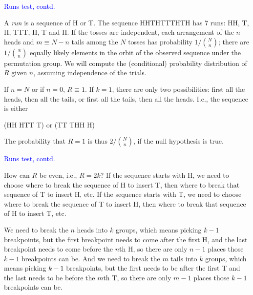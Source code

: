 \documentclass[landscape]{slides}
\begin{document}
\begin{slide}
{\textcolor{blue}{Runs test, contd.}}

A {\em run\/} is a sequence of H or T.  
The sequence HHTHTTTHTH has 7 runs: HH, T, H, TTT, H, T and H.
If the tosses are independent, each arrangement of the $n$ heads 
and $m \equiv N-n$ tails among
    the $N$ tosses has probability $1/{{N}\choose{n}}$;
    there are $1/{{N}\choose{n}}$ equally likely elements in the orbit of
    the observed sequence under the permutation group.
    We will compute the (conditional) probability distribution of $R$ given
    $n$, assuming independence of the trials.

    If $n=N$ or if $n = 0$, $R \equiv 1$.
    If $k= 1$, there are only two possibilities: first all the heads,
    then all the tails, or first all the tails, then all the heads.
    I.e., the sequence is either

\begin{center}
   (HH \textellipsis HTT \textellipsis T) or (TT \textellipsis THH \textellipsis H)
\end{center}

    The probability that $R=1$ is thus $2/{{N}\choose{n}}$,
    if the null hypothesis is true.

\end{slide}

\begin{slide}
{\textcolor{blue}{Runs test, contd.}}

    How can $R$ be even, i.e., $R = 2k$?
    If the sequence starts with H, we need to choose where to break the
    sequence of H to insert T,
    then where to break that sequence of T to insert H, etc.
    If the sequence starts with T, we need to choose where to break the
    sequence of T to insert H,
    then where to break that sequence of H to insert T, etc.
    
    We need to break the $n$ heads into $k$ groups,
    which means picking $k - 1$ breakpoints,
    but the first breakpoint needs to come after the first H, and the
    last breakpoint needs to come before the $n$th H, so there are only
    $n - 1$ places those $k - 1$
    breakpoints can be.
    And we need to break the $m$ tails into $k$ groups,
    which means picking $k - 1$ breakpoints,
    but the first needs to be after the first T and the last needs to be
    before the $m$th T, so there are only $m - 1$
    places those $k - 1$ breakpoints can be.

\end{slide}
\end{document}
